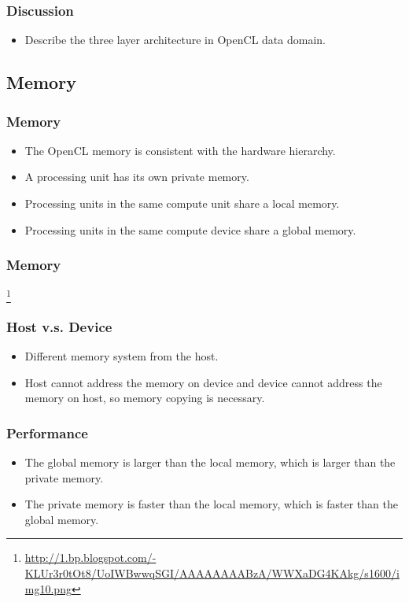 \documentclass{beamer}
\begin{document}
\begin{frame}
  \frametitle{Discussion}
  \begin{itemize}
  \item Describe the three layer architecture in OpenCL data domain.
  \end{itemize}
\end{frame}

\subsection{Memory}

\begin{frame}
  \frametitle{Memory}
  \begin{itemize}
  \item The OpenCL memory is consistent with the hardware hierarchy.
  \item A processing unit has its own private memory.
  \item Processing units in the same compute unit share a local memory.
  \item Processing units in the same compute device share a global memory.
  \end{itemize}
\end{frame}

\begin{frame}
  \frametitle{Memory}
  \centerline{}\footnote{\url{http://1.bp.blogspot.com/-KLUr3r0tOt8/UoIWBwwqSGI/AAAAAAAABzA/WWXaDG4KAkg/s1600/img10.png}}
\end{frame}

\begin{frame}
  \frametitle{Host v.s. Device}
  \begin{itemize}
  \item Different memory system from the host.
  \item Host cannot address the memory on device and device cannot
    address the memory on host, so memory copying is necessary.
  \end{itemize}
\end{frame}

\begin{frame}
  \frametitle{Performance}
  \begin{itemize}
  \item The global memory is larger than the local memory, which is
    larger than the private memory.
  \item The private memory is faster than the local memory, which is
    faster than the global memory.
  \end{itemize}
\end{frame}
\end{document}
